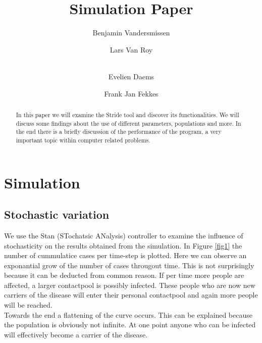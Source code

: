 \documentclass[runningheads]{llncs}
\begin{document}
%
\title{Simulation Paper}

\author{Benjamin Vandersmissen \and
Lars Van Roy \and \\
Evelien Daems \and
Frank Jan Fekkes}
%
%
%
\maketitle              %
%
\begin{abstract}
In this paper we will examine the Stride tool and discover its functionalities.
We will discuss some findings about the use of different parameters, populations and more.
In the end there is a briefly discussion of the performance of the program, a very important topic within computer related problems.

\end{abstract}

\section{Simulation}

\subsection{Stochastic variation}
We use the Stan (STochatsic ANalysis) controller to examine the influence of stochasticity on the results obtained from the simulation. \newline
In Figure \ref{fig1} the number of cummulatice cases per time-step is plotted. Here we can observe an exponantial grow of the number of cases througout time. This is not surprisingly because it can be deducted from common reason. If per time more people are affected, a larger contactpool is possibly infected. These people who are now new carriers of the disease will enter their personal contactpool and again more people will be reached.\\
Towards the end a flattening of the curve occurs. This can be explained because the population is obviously not infinite. At one point anyone who can be infected will effectively become a carrier of the disease.
\end{document}
